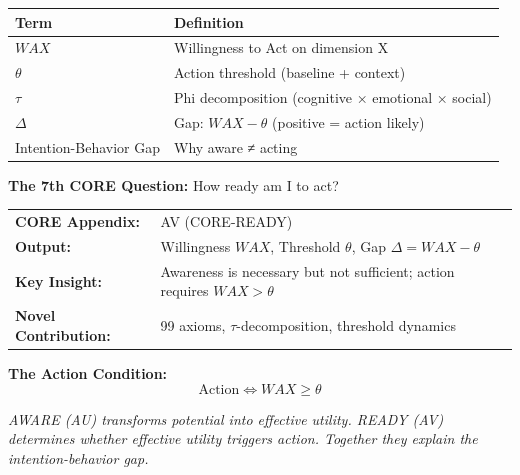 \begin{tcolorbox}[
    colback=gray!5!white,
    colframe=gray!75!black,
    title={\textbf{Begriffe in diesem Kapitel}},
    fonttitle=\bfseries
]
\small
\begin{tabular}{@{}ll@{}}
\textbf{Term} & \textbf{Definition} \\
\midrule
$WAX$ & Willingness to Act on dimension X \\
$\theta$ & Action threshold (baseline + context) \\
$\tau$ & Phi decomposition (cognitive × emotional × social) \\
$\Delta$ & Gap: $WAX - \theta$ (positive = action likely) \\
Intention-Behavior Gap & Why aware ≠ acting \\
\end{tabular}
\end{tcolorbox}


\begin{tcolorbox}[
    colback=violet!5!white,
    colframe=violet!75!black,
    title={\textbf{10C CORE Connection: READY (Question 7)}},
    fonttitle=\bfseries
]
\textbf{The 7th CORE Question:} How ready am I to act?

\medskip
\begin{tabular}{ll}
\textbf{CORE Appendix:} & AV (CORE-READY) \\
\textbf{Output:} & Willingness $WAX$, Threshold $\theta$, Gap $\Delta = WAX - \theta$ \\
\textbf{Key Insight:} & Awareness is necessary but not sufficient; action requires $WAX > \theta$ \\
\textbf{Novel Contribution:} & 99 axioms, $\tau$-decomposition, threshold dynamics
\end{tabular}

\medskip
\textbf{The Action Condition:}
\begin{equation}
\boxed{\text{Action} \Leftrightarrow WAX \geq \theta}
\label{eq:action-condition}
\end{equation}

\textit{AWARE (AU) transforms potential into effective utility. READY (AV) determines whether effective utility triggers action. Together they explain the intention-behavior gap.}
\end{tcolorbox}


